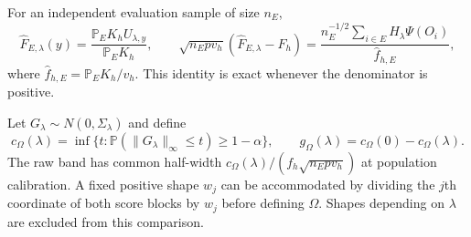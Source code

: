 \documentclass[11pt]{article}
\theoremstyle{remark}\newtheorem{remark}[theorem]{Remark}
\newcommand{\Pp}{\mathbb P}
\begin{document}
For an independent evaluation sample of size $n_E$,
\begin{equation}
 \widehat F_{E,\lambda}(y)=\frac{\mathbb P_E K_h U_{\lambda,y}}{\mathbb P_E K_h},\qquad
 \sqrt{n_E p v_h}(\widehat F_{E,\lambda}-F_h)
 =\frac{n_E^{-1/2}\sum_{i\in E}H_\lambda\Psi(O_i)}{\widehat f_{h,E}},
 \label{eq:ratio}
\end{equation}
where $\widehat f_{h,E}=\mathbb P_E K_h/v_h$. This identity is exact whenever the denominator is positive.

Let $G_\lambda\sim N(0,\Sigma_\lambda)$ and define
\begin{equation}
 c_\Omega(\lambda)=\inf\{t:\Pp(\|G_\lambda\|_\infty\leq t)\geq1-\alpha\},\qquad
 g_\Omega(\lambda)=c_\Omega(0)-c_\Omega(\lambda).
 \label{eq:gain}
\end{equation}
The raw band has common half-width $c_\Omega(\lambda)/(f_h\sqrt{n_Epv_h})$ at population calibration. A fixed positive shape $w_j$ can be accommodated by dividing the $j$th coordinate of both score blocks by $w_j$ before defining $\Omega$. Shapes depending on $\lambda$ are excluded from this comparison.
\end{document}
